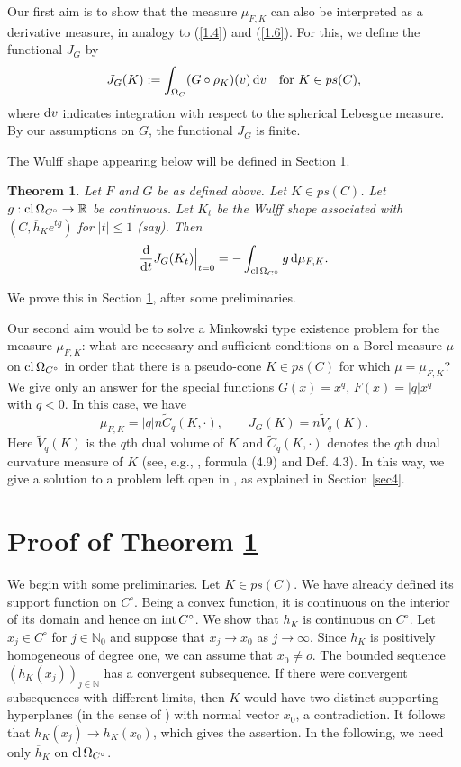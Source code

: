 \documentclass[12pt]{article}
\newcommand{\0}{\mbox{\boldmath$o$}}
\newcommand{\R}{{\mathbb R}}
\newcommand{\N}{{\mathbb N}}
\newcommand{\D}{{\rm d}}
\newtheorem{theorem}{Theorem}%
\begin{document}
Our first aim is to show that the measure $\mu_{F,K}$ can also be interpreted as a derivative measure, in analogy to (\ref{1.4}) and (\ref{1.6}). For this, we define the functional $J_G$ by
$$ J_G(K):= \int_{\Omega_C} (G\circ \rho_K)(v)\,\D v\quad\mbox{for } K\in ps(C),$$
where $\D v$ indicates integration with respect to the spherical Lebesgue measure. By our assumptions on $G$, the functional $J_G$ is finite. 

The Wulff shape appearing below will be defined in Section \ref{sec3}.

\begin{theorem}\label{T2.1}
Let $F$ and $G$ be as defined above. Let $K\in ps(C)$. Let $g:{\rm cl}\,\Omega_{C^\circ}\to\R$ be continuous. Let $K_t$ be the Wulff shape associated with $(C, \overline h_Ke^{tg})$ for $|t|\le 1$ (say). Then
$$ \frac{\D}{\D t} J_G(K_t)\Big|_{t=0} = -\int_{{\rm cl}\,\Omega_{C^\circ}} g\,\D \mu_{F,K}.$$
\end{theorem}

We prove this in Section \ref{sec3}, after some preliminaries.

Our second aim would be to solve a Minkowski type existence problem for the measure $\mu_{F,K}$: what are necessary and sufficient conditions on a Borel measure $\mu$ on ${\rm cl}\,\Omega_{C^\circ}$ in order that there is a pseudo-cone $K\in ps(C)$ for which $\mu=\mu_{F,K}$? We give only an answer for the special functions $G(x)= x^q$, $F(x)=|q|x^q$ with $q<0$. In this case, we have
\begin{equation}\label{2.1} 
\mu_{F,K}= |q|n\widetilde C_q(K,\cdot),\qquad J_G(K)= n \widetilde V_q(K).
\end{equation}
Here $\widetilde V_q(K)$ is the $q$th dual volume of $K$ and $\widetilde C_q(K,\cdot)$ denotes the $q$th dual curvature measure of $K$ (see, e.g., \cite{LYZ24}, formula (4.9) and Def. 4.3). In this way, we give a solution to a problem left open in \cite{LYZ24}, as explained in Section \ref{sec4}.
 




\section{Proof of Theorem \ref{T2.1}}\label{sec3}

We begin with some preliminaries. Let $K\in ps(C)$. We have already defined its support function on $C^\circ$. Being a convex function, it is continuous on the interior of its domain and hence on ${\rm int}\,C^\circ$. We show that $h_K$ is continuous on $C^\circ$. Let $x_j\in C^\circ$ for $j\in\N_0$ and suppose that $x_j\to x_0$ as $j\to\infty$. Since $h_K$ is positively homogeneous of degree one, we can assume that $x_0\not= o$. The bounded sequence $(h_K(x_j))_{j\in\N}$ has a convergent subsequence. If there were convergent subsequences with different limits, then $K$ would have two distinct supporting hyperplanes (in the sense of \cite[p. 45]{Sch14}) with normal vector $x_0$, a contradiction. It follows that $h_K(x_j)\to h_K(x_0)$, which gives the assertion. In the following, we need only $\overline h_K$ on ${\rm cl }\,\Omega_{C^\circ}$.
\end{document}
